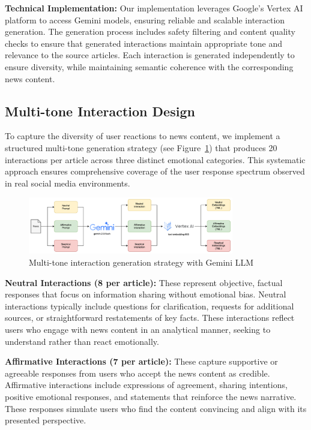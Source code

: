 \textbf{Technical Implementation:} Our implementation leverages Google's Vertex AI platform to access Gemini models, ensuring reliable and scalable interaction generation. The generation process includes safety filtering and content quality checks to ensure that generated interactions maintain appropriate tone and relevance to the source articles. Each interaction is generated independently to ensure diversity, while maintaining semantic coherence with the corresponding news content.

\subsection{Multi-tone Interaction Design}

To capture the diversity of user reactions to news content, we implement a structured multi-tone generation strategy (see Figure~\ref{fig:interaction-generation}) that produces 20 interactions per article across three distinct emotional categories. This systematic approach ensures comprehensive coverage of the user response spectrum observed in real social media environments.

\begin{figure}[h]
    \centering
    \includegraphics[width=0.8\textwidth]{context/methodology/fig/user_interaction_generation.png}
    \caption{Multi-tone interaction generation strategy with Gemini LLM}
    \label{fig:interaction-generation}
\end{figure}

\textbf{Neutral Interactions (8 per article):} These represent objective, factual responses that focus on information sharing without emotional bias. Neutral interactions typically include questions for clarification, requests for additional sources, or straightforward restatements of key facts. These interactions reflect users who engage with news content in an analytical manner, seeking to understand rather than react emotionally.

\textbf{Affirmative Interactions (7 per article):} These capture supportive or agreeable responses from users who accept the news content as credible. Affirmative interactions include expressions of agreement, sharing intentions, positive emotional responses, and statements that reinforce the news narrative. These responses simulate users who find the content convincing and align with its presented perspective.

